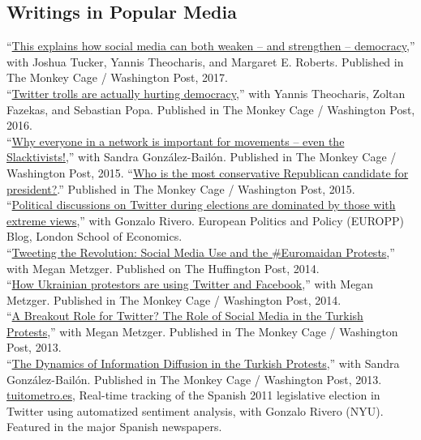 \documentclass[margin,line,11pt]{resume}
\newcommand{\nl}{\vspace{0.10in}\\}
\begin{document}
\begin{resume}
                \section{\mysidestyle Writings in Popular Media}
``\href{https://www.washingtonpost.com/news/monkey-cage/wp/2017/12/06/this-explains-how-social-media-can-both-weaken-and-strengthen-democracy/?utm_term=.d52c930452e9}{This explains how social media can both weaken -- and strengthen -- democracy},'' with Joshua Tucker, Yannis Theocharis, and Margaret E. Roberts. Published in The Monkey Cage / Washington Post, 2017.\nl               
``\href{https://www.washingtonpost.com/news/monkey-cage/wp/2016/11/04/twitter-trolls-hurt-democracy-more-than-you-realize-heres-how/}{Twitter trolls are actually hurting democracy},'' with Yannis Theocharis, Zoltan Fazekas, and Sebastian Popa. Published in The Monkey Cage / Washington Post, 2016.\nl
``\href{https://www.washingtonpost.com/news/monkey-cage/wp/2015/11/30/why-everyone-in-a-network-is-important-for-movements-even-the-slactivists/}{Why everyone in a network is important for movements -- even the Slacktivists!},'' with Sandra Gonz\'{a}lez-Bail\'{o}n. Published in The Monkey Cage / Washington Post, 2015.
\newpage
``\href{http://www.washingtonpost.com/blogs/monkey-cage/wp/2015/06/16/who-is-the-most-conservative-republican-candidate-for-president/}{Who is the most conservative Republican candidate for president?}.'' Published in The Monkey Cage / Washington Post, 2015.\nl
``\href{http://blogs.lse.ac.uk/politicsandpolicy/political-discussions-on-twitter-during-elections-are-dominated-by-those-with-extreme-views/}{Political discussions on Twitter during elections are dominated by those with extreme views},'' with Gonzalo Rivero. European Politics and Policy (EUROPP) Blog, London School of Economics.\nl
 ``\href{http://www.huffingtonpost.com/pablo-barbera/tweeting-the-revolution-s_b_4831104.html}{Tweeting the Revolution: Social Media Use and the \#Euromaidan Protests},'' with Megan Metzger. Published on The Huffington Post, 2014.\nl
 ``\href{http://www.washingtonpost.com/blogs/monkey-cage/wp/2013/12/04/strategic-use-of-facebook-and-twitter-in-ukrainian-protests/}{How Ukrainian protestors are using Twitter and Facebook},'' with Megan Metzger. Published in The Monkey Cage / Washington Post, 2014.\nl
 ``\href{http://themonkeycage.org/2013/06/01/a-breakout-role-for-twitter-extensive-use-of-social-media-in-the-absence-of-traditional-media-by-turks-in-turkish-in-taksim-square-protests/}{A Breakout Role for Twitter? The Role of Social Media in the Turkish Protests},'' with Megan Metzger. Published in The Monkey Cage / Washington Post, 2013.\nl
 ``\href{http://themonkeycage.org/2013/06/30822/}{The Dynamics of Information Diffusion in the Turkish Protests},'' with Sandra Gonz\'{a}lez-Bail\'{o}n. Published in The Monkey Cage / Washington Post, 2013.\nl
\href{http://www.tuitometro.es}{tuitometro.es}, Real-time tracking of the Spanish 2011 legislative election in Twitter using automatized sentiment analysis, with Gonzalo Rivero (NYU). Featured in the major Spanish newspapers.
  


\end{resume}
\end{document}
